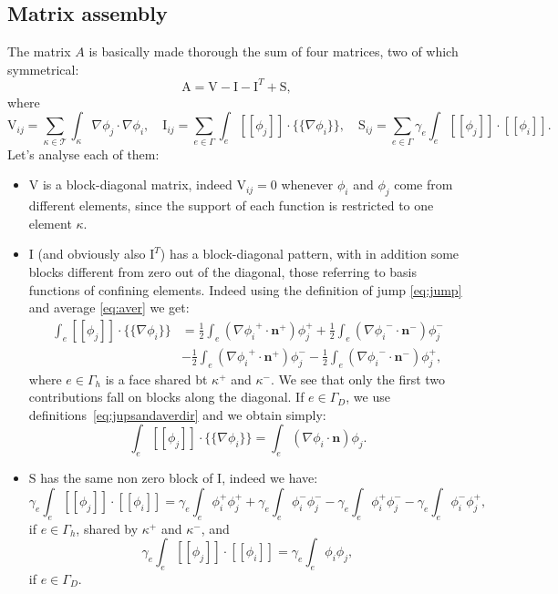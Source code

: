 \documentclass[12pt, a4paper]{article}
\theoremstyle{definition}
\theoremstyle{plain}
\theoremstyle{plain}
\begin{document}
\subsection{Matrix assembly}
The matrix $A$ is basically made thorough the sum of four matrices, two of which symmetrical:
\begin{equation*}
	\mathrm{A} = \mathrm{V} - \mathrm{I} - \mathrm{I}^T + \mathrm{S},
\end{equation*}
where
\begin{equation*}
	\mathrm{V}_{ij} = \sum_{\kappa \in \mathcal{T}} \int_\kappa \nabla \phi_j \cdot \nabla \phi_i,
	\quad \mathrm{I}_{ij} = \sum_{e \in \Gamma} \int_e [\![\phi_j]\!] \cdot \{\!\!\{ \nabla \phi_i \}\!\!\},
	\quad \mathrm{S}_{ij} = \sum_{e \in \Gamma} \gamma_e \int_e [\![ \phi_j ]\!] \cdot [\![ \phi_i ]\!].
\end{equation*}
Let's analyse each of them:
\begin{itemize}
	\item $\mathrm{V}$ is a block-diagonal matrix, indeed $\mathrm{V}_{ij} = 0$ whenever $\phi_i$ and $\phi_j$ come from different elements, since the support of each function is restricted to one element $\kappa$.
	\item $\mathrm{I}$ (and obviously also $\mathrm{I}^T$) has a block-diagonal pattern, with in addition some blocks different from zero out of the diagonal, those referring to basis functions of confining elements. Indeed using the definition of jump \eqref{eq:jump} and average \eqref{eq:aver} we get:
	\begin{align*}
		\int_e [\![\phi_j]\!] \cdot \{\!\!\{ \nabla \phi_i \}\!\!\} &=
		\frac{1}{2} \int_e (\nabla{\phi_i}^+ \cdot \mathbf{n}^+ )\phi_j^+
		+ \frac{1}{2} \int_e (\nabla{\phi_i}^- \cdot \mathbf{n}^- )\phi_j^-\\
		&- \frac{1}{2} \int_e (\nabla{\phi_i}^+ \cdot \mathbf{n}^+ )\phi_j^-
		- \frac{1}{2} \int_e (\nabla{\phi_i}^- \cdot \mathbf{n}^- )\phi_j^+,
	\end{align*}
	where $e \in \Gamma_h$ is a face shared bt $\kappa^+$ and $\kappa^-$. We see that only the first two contributions fall on blocks along the diagonal. If $e \in \Gamma_D$, we use definitions~\eqref{eq:jupsandaverdir} and we obtain simply:
	\begin{equation*}
		\int_e [\![\phi_j]\!] \cdot \{\!\!\{ \nabla \phi_i \}\!\!\} = \int_e (\nabla{\phi_i} \cdot \mathbf{n} )\phi_j.
	\end{equation*}
	\item $\mathrm{S}$ has the same non zero block of $\mathrm{I}$, indeed we have:
	\begin{equation*}
		\gamma_e \int_e [\![\phi_j]\!] \cdot [\![\phi_i]\!] =
		\gamma_e \int_e \phi_i^+ \phi_j^+
		+ \gamma_e \int_e \phi_i^- \phi_j^-
		- \gamma_e \int_e \phi_i^+ \phi_j^-
		- \gamma_e \int_e \phi_i^- \phi_j^+,
	\end{equation*}
	if $e \in \Gamma_h$, shared by $\kappa^+$ and $\kappa^-$, and
	\begin{equation*}
		\gamma_e \int_e [\![\phi_j]\!] \cdot [\![\phi_i]\!] =
		\gamma_e \int_e \phi_i \phi_j,
	\end{equation*}
	if $e \in \Gamma_D$.
\end{itemize}
\end{document}
